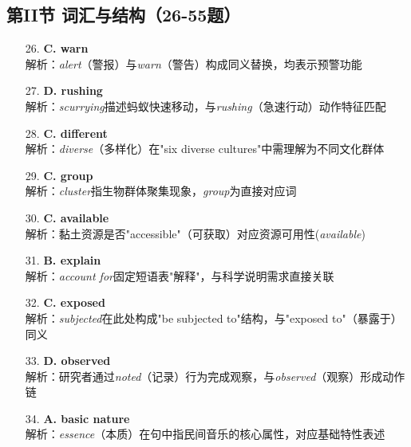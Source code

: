 \documentclass{article}
\begin{document}
\subsection*{第II节 词汇与结构（26-55题）}
\begin{enumerate}
    \item[26.] \textbf{C. warn} \\ 
    解析：\textit{alert}（警报）与\textit{warn}（警告）构成同义替换，均表示预警功能
    
    \item[27.] \textbf{D. rushing} \\ 
    解析：\textit{scurrying}描述蚂蚁快速移动，与\textit{rushing}（急速行动）动作特征匹配
    
    \item[28.] \textbf{C. different} \\ 
    解析：\textit{diverse}（多样化）在"six diverse cultures"中需理解为不同文化群体
    
    \item[29.] \textbf{C. group} \\ 
    解析：\textit{cluster}指生物群体聚集现象，\textit{group}为直接对应词
    
    \item[30.] \textbf{C. available} \\ 
    解析：黏土资源是否"accessible"（可获取）对应资源可用性(\textit{available})
    
    \item[31.] \textbf{B. explain} \\ 
    解析：\textit{account for}固定短语表"解释"，与科学说明需求直接关联
    
    \item[32.] \textbf{C. exposed} \\ 
    解析：\textit{subjected}在此处构成"be subjected to"结构，与"exposed to"（暴露于）同义
    
    \item[33.] \textbf{D. observed} \\ 
    解析：研究者通过\textit{noted}（记录）行为完成观察，与\textit{observed}（观察）形成动作链
    
    \item[34.] \textbf{A. basic nature} \\ 
    解析：\textit{essence}（本质）在句中指民间音乐的核心属性，对应基础特性表述
\end{enumerate}
\end{document}
